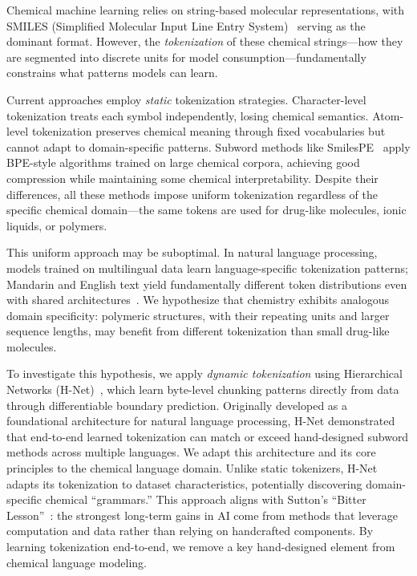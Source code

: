 \documentclass{article}
\newcommand{\hnet}{H-Net}
\newcommand{\smilespe}{SmilesPE}
\begin{document}
Chemical machine learning relies on string-based molecular representations, with SMILES (Simplified Molecular Input Line Entry System)~\citep{weininger1988smiles} serving as the dominant format. However, the \emph{tokenization} of these chemical strings---how they are segmented into discrete units for model consumption---fundamentally constrains what patterns models can learn.

Current approaches employ \emph{static} tokenization strategies. Character-level tokenization treats each symbol independently, losing chemical semantics. Atom-level tokenization preserves chemical meaning through fixed vocabularies but cannot adapt to domain-specific patterns. Subword methods like \smilespe{}~\citep{li2020smilespe} apply BPE-style algorithms trained on large chemical corpora, achieving good compression while maintaining some chemical interpretability. Despite their differences, all these methods impose uniform tokenization regardless of the specific chemical domain---the same tokens are used for drug-like molecules, ionic liquids, or polymers.

This uniform approach may be suboptimal. In natural language processing, models trained on multilingual data learn language-specific tokenization patterns; Mandarin and English text yield fundamentally different token distributions even with shared architectures~\citep{hwang2025hnet}. We hypothesize that chemistry exhibits analogous domain specificity: polymeric structures, with their repeating units and larger sequence lengths, may benefit from different tokenization than small drug-like molecules.

To investigate this hypothesis, we apply \emph{dynamic tokenization} using Hierarchical Networks (\hnet{})~\citep{hwang2025hnet}, which learn byte-level chunking patterns directly from data through differentiable boundary prediction. Originally developed as a foundational architecture for natural language processing, \hnet{} demonstrated that end-to-end learned tokenization can match or exceed hand-designed subword methods across multiple languages. We adapt this architecture and its core principles to the chemical language domain. Unlike static tokenizers, \hnet{} adapts its tokenization to dataset characteristics, potentially discovering domain-specific chemical ``grammars.'' This approach aligns with Sutton's ``Bitter Lesson''~\citep{sutton2019bitter}: the strongest long-term gains in AI come from methods that leverage computation and data rather than relying on handcrafted components. By learning tokenization end-to-end, we remove a key hand-designed element from chemical language modeling.
\end{document}
